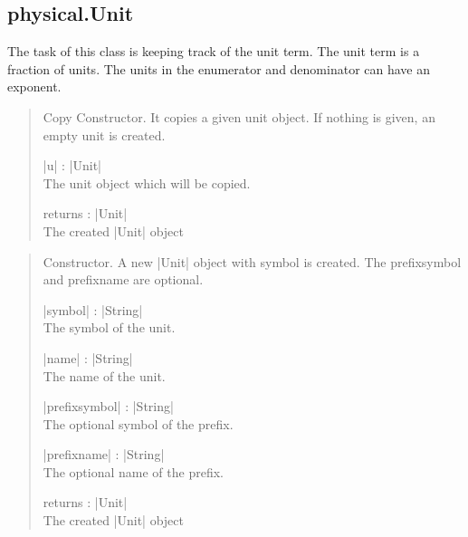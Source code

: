 \documentclass{ltxdoc}
\begin{document}
\newpage
\subsection{physical.Unit}

The task of this class is keeping track of the unit term. The unit term is a fraction of units. The units in the enumerator and denominator can have an exponent.


\begin{quote}
  Copy Constructor. It copies a given unit object. If nothing is given, an empty unit is created.

  \begin{description}
  \item |u| : |Unit|\\
    The unit object which will be copied.

  \item returns : |Unit|\\
    The created |Unit| object
  \end{description}

\end{quote}


\begin{quote}
  Constructor. A new |Unit| object with symbol is created. The prefixsymbol and prefixname are optional.

  \begin{description}
  \item |symbol| : |String|\\
    The symbol of the unit.

  \item |name| : |String|\\
    The name of the unit.

  \item |prefixsymbol| : |String|\\
    The optional symbol of the prefix.

  \item |prefixname| : |String|\\
    The optional name of the prefix.

  \item returns : |Unit|\\
    The created |Unit| object
  \end{description}

\end{quote}
\end{document}
